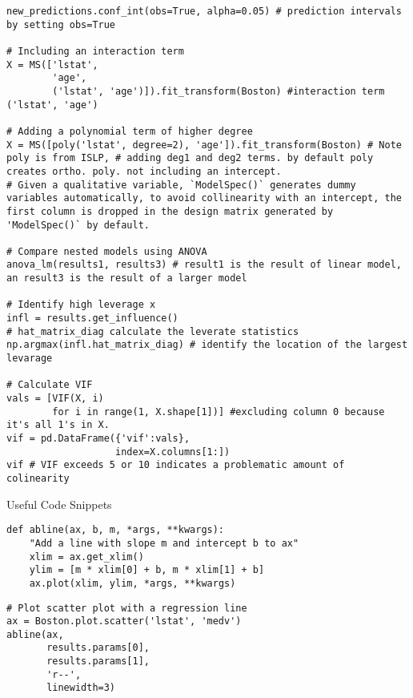 \documentclass[
  letterpaper,
  DIV=11,
  numbers=noendperiod]{scrreprt}
\begin{document}
\begin{verbatim}
new_predictions.conf_int(obs=True, alpha=0.05) # prediction intervals by setting obs=True

# Including an interaction term
X = MS(['lstat',
        'age',
        ('lstat', 'age')]).fit_transform(Boston) #interaction term ('lstat', 'age')

# Adding a polynomial term of higher degree
X = MS([poly('lstat', degree=2), 'age']).fit_transform(Boston) # Note poly is from ISLP, # adding deg1 and deg2 terms. by default poly creates ortho. poly. not including an intercept. 
# Given a qualitative variable, `ModelSpec()` generates dummy
variables automatically, to avoid collinearity with an intercept, the first column is dropped in the design matrix generated by 'ModelSpec()` by default.

# Compare nested models using ANOVA
anova_lm(results1, results3) # result1 is the result of linear model, an result3 is the result of a larger model

# Identify high leverage x
infl = results.get_influence() 
# hat_matrix_diag calculate the leverate statistics
np.argmax(infl.hat_matrix_diag) # identify the location of the largest levarage

# Calculate VIF
vals = [VIF(X, i)
        for i in range(1, X.shape[1])] #excluding column 0 because it's all 1's in X.
vif = pd.DataFrame({'vif':vals},
                   index=X.columns[1:])
vif # VIF exceeds 5 or 10 indicates a problematic amount of colinearity
\end{verbatim}

Useful Code Snippets

\begin{verbatim}
def abline(ax, b, m, *args, **kwargs):
    "Add a line with slope m and intercept b to ax"
    xlim = ax.get_xlim()
    ylim = [m * xlim[0] + b, m * xlim[1] + b]
    ax.plot(xlim, ylim, *args, **kwargs)
\end{verbatim}

\begin{verbatim}
# Plot scatter plot with a regression line
ax = Boston.plot.scatter('lstat', 'medv')
abline(ax,
       results.params[0],
       results.params[1],
       'r--',
       linewidth=3)
\end{verbatim}
\end{document}
